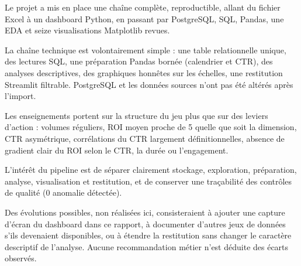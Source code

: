 Le projet a mis en place une chaîne complète, reproductible, allant du fichier Excel à un dashboard Python, en passant par PostgreSQL, SQL, Pandas, une EDA et seize visualisations Matplotlib revues.

La chaîne technique est volontairement simple : une table relationnelle unique, des lectures SQL, une préparation Pandas bornée (calendrier et CTR), des analyses descriptives, des graphiques honnêtes sur les échelles, une restitution Streamlit filtrable. PostgreSQL et les données sources n'ont pas été altérés après l'import.

Les enseignements portent sur la structure du jeu plus que sur des leviers d'action : volumes réguliers, ROI moyen proche de 5 quelle que soit la dimension, CTR asymétrique, corrélations du CTR largement définitionnelles, absence de gradient clair du ROI selon le CTR, la durée ou l'engagement.

L'intérêt du pipeline est de séparer clairement stockage, exploration, préparation, analyse, visualisation et restitution, et de conserver une traçabilité des contrôles de qualité (0 anomalie détectée).

Des évolutions possibles, non réalisées ici, consisteraient à ajouter une capture d'écran du dashboard dans ce rapport, à documenter d'autres jeux de données s'ils devenaient disponibles, ou à étendre la restitution sans changer le caractère descriptif de l'analyse. Aucune recommandation métier n'est déduite des écarts observés.
